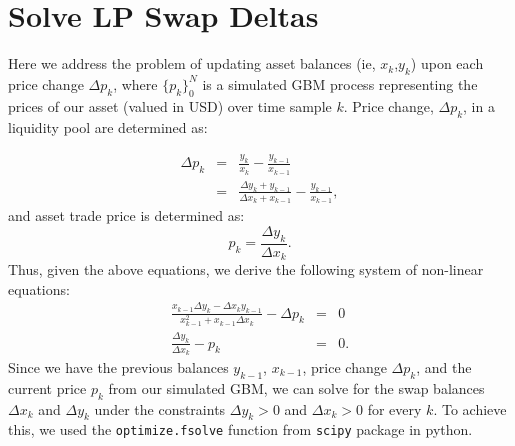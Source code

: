 \documentclass[journal,twocolumn,12pt]{ieeesyscoin}
\begin{document}
\section{Solve LP Swap Deltas}
\label{sec:lp_swap_deltas}
Here we address the problem of updating asset balances (ie, $x_{k}$,$y_{k}$) upon each price change $\Delta p_{k}$, where $\{p_{k}\}_{0}^{N}$ is a simulated GBM process representing the prices of our asset (valued in USD) over time sample $k$. Price change, $\Delta p_{k}$, in a liquidity pool are determined as:

\begin{eqnarray*}\label{eqn:deltap1}
\Delta p_{k} &=& \frac{y_{k}}{x_{k}} - \frac{y_{k-1}}{x_{k-1}} \\
			 &=& \frac{\Delta y_{k} + y_{k-1}}{\Delta x_{k} + x_{k-1}} - \frac{y_{k-1}}{x_{k-1}},
\end{eqnarray*}
and asset trade price is determined as: 
\begin{equation}\label{eqn:deltap2}
  p_{k} = \frac{\Delta y_{k}}{\Delta x_{k}}.
\end{equation}
Thus, given the above equations, we derive the following system of non-linear equations:
\begin{eqnarray}\label{eqn:non_linear_system}
\frac{x_{k-1} \Delta y_{k} - \Delta x_{k} y_{k-1}}{x_{k-1}^2 + x_{k-1} \Delta x_{k}} - \Delta p_{k} &=& 0 \\
\frac{\Delta y_{k}}{\Delta x_{k}} - p_{k} &=& 0.
\end{eqnarray}
Since we have the previous balances $y_{k-1}$, $x_{k-1}$, price change $\Delta p_{k}$, and the current price $p_{k}$ from our simulated GBM, we can solve for the swap balances $\Delta x_{k}$ and $\Delta y_{k}$ under the constraints $\Delta y_{k} > 0$ and $\Delta x_{k} > 0$ for every $k$. To achieve this, we used the \verb|optimize.fsolve| function from \verb|scipy| package in python. 
\end{document}
